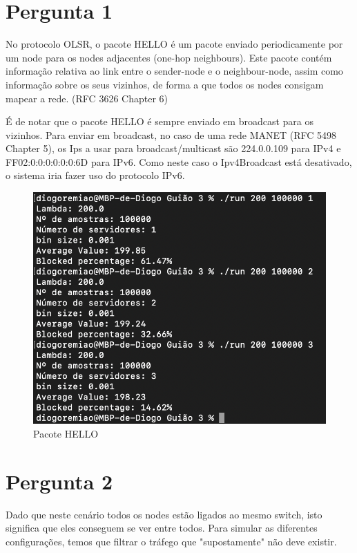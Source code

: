\chapter{Pergunta 1} \label{ex_1}

No protocolo OLSR, o pacote HELLO é um pacote enviado periodicamente por um node para os nodes adjacentes (one-hop neighbours).
Este pacote contém informação relativa ao link entre o sender-node e o neighbour-node, assim como informação sobre os seus vizinhos,
de forma a que todos os nodes consigam mapear a rede. (RFC 3626 Chapter 6)

É de notar que o pacote HELLO é sempre enviado em broadcast para os vizinhos.
Para enviar em broadcast, no caso de uma rede MANET (RFC 5498 Chapter 5), os Ips a usar para broadcast/multicast são 224.0.0.109 para IPv4
e FF02:0:0:0:0:0:0:6D para IPv6. Como neste caso o Ipv4Broadcast está desativado, o sistema iria fazer uso do protocolo IPv6.

\begin{figure}[H]
    \centering
    \includegraphics[width=\linewidth]{figs/image_1.png}
    \caption{Pacote HELLO}
    \label{fig:1}
\end{figure}

\chapter{Pergunta 2} \label{ex_2}

Dado que neste cenário todos os nodes estão ligados ao mesmo switch, isto significa que eles conseguem se ver entre todos.
Para simular as diferentes configurações, temos que filtrar o tráfego que "supostamente" não deve existir.

